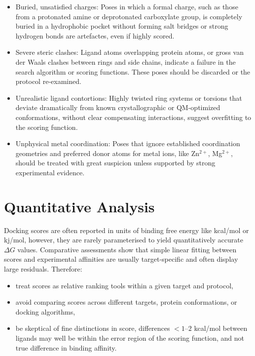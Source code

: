 \documentclass[12pt,a4paper]{article}
\begin{document}
\begin{itemize}
  \item Buried, unsatisfied charges: Poses in which a formal charge, such as those from a protonated amine or deprotonated carboxylate group, is completely buried in a hydrophobic pocket without forming salt bridges or strong hydrogen bonds are artefactes, even if highly scored.
  \item Severe steric clashes: Ligand atoms overlapping protein atoms, or gross van der Waals clashes between rings and side chains, indicate a failure in the search algorithm or scoring functions. These poses should be discarded or the protocol re-examined.
  \item Unrealistic ligand contortions: Highly twisted ring systems or torsions that deviate dramatically from known crystallographic or QM-optimized conformations, without clear compensating interactions, suggest overfitting to the scoring function.
  \item Unphysical metal coordination: Poses that ignore established coordination geometries and preferred donor atoms for metal ions, like Zn$^{2+}$, Mg$^{2+}$, should be treated with great suspicion unless supported by strong experimental evidence.
\end{itemize}

\section{Quantitative Analysis}

Docking scores are often reported in units of binding free energy like kcal/mol or kj/mol, however, they are rarely parameterised to yield quantitatively accurate $\Delta G$ values. Comparative assessments show that simple linear fitting between scores and experimental affinities are usually target-specific and often display large residuals.\cite{CH8_Warren2006,CH8_Cheng2009} Therefore:

\begin{itemize}
  \item treat scores as relative ranking tools within a given target and protocol,
  \item avoid comparing scores across different targets, protein conformations, or docking algorithms,
  \item be skeptical of fine distinctions in score, differences $< 1$--$2$ kcal/mol between ligands may well be within the error region of the scoring function, and not true difference in binding affinity.
\end{itemize}
\end{document}
